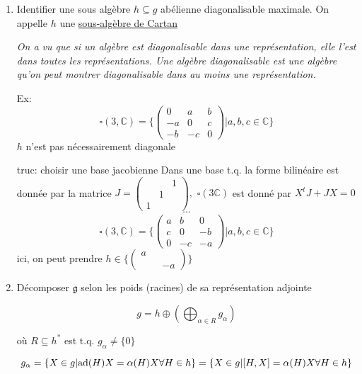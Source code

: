 \begin{enumerate}[label=\textbf{Étape \arabic*:}] 
	\item Identifier une sous algèbre \(h \subseteq g\) abélienne diagonalisable maximale. On appelle \(h\) une \underline{sous-algèbre de Cartan}


\textit{On a vu que si un algèbre est diagonalisable dans une représentation, elle l'est dans toutes les représentations. Une algèbre diagonalisable est une algèbre qu'on peut montrer diagonalisable dans au moins une représentation.}


\begin{tcolorbox}[title=Attention]
	Ex: \[ \square (3, \mathds{C}) = \{ \begin{pmatrix} 0 & a  & b \\ -a &0 & c \\ -b & -c &0 \end{pmatrix}  | a,b,c \in \mathds{C} \}  \] 
\(h\) n'est pas nécessairement diagonale

truc: choisir une base jacobienne
	Dans une base t.q. la forme bilinéaire est donnée par la matrice 
	\(J = \begin{pmatrix} & & 1\\ & 1 \\ 1 \end{pmatrix}, \) \(\square(3 \mathds{C}) \) est donné par \( X^{t}J + JX = 0  \)
	\[ \dotsb \]
\[ \square(3 ,\mathds{C}) = \{ \begin{pmatrix} a & b &0\\ c &0 & -b \\ 0 & -c & -a \end{pmatrix} | a,b,c \in \mathds{C}  \}  \]
	ici, on peut prendre \(h \in \{ \begin{pmatrix} a & &\\\\ && -a \end{pmatrix}  \} \)



\end{tcolorbox}

\item Décomposer \(\mathfrak{g}\) selon les poids (racines) de sa représentation adjointe


	\[ g = h \oplus \left( \bigoplus_{\alpha\in R} g_{\alpha}   \right)  \]

	où \(R \subseteq h^{*}\) est t.q. \(g_{\alpha} \neq \{ 0 \} \)

	\[ g_{\alpha} = \{ X \in g | {\rm{}ad}(H) X = \alpha(H) X \forall H \in h\} = \{ X \in g | [H, X] = \alpha(H) X \forall H \in h \}   \]


\end{enumerate}
